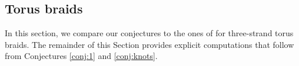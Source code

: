 \documentclass[12pt]{amsart}
\numberwithin{equation}{section}
\theoremstyle{definition}
\theoremstyle{remark}
\newcommand{\CE}{\mathcal{E}}
\newcommand{\CO}{\mathcal{O}}
\newcommand{\CT}{\mathcal{T}}
\renewcommand{\1}{\mathbf{1}}
\newcommand{\FH}{\mathrm{FHilb}}
\begin{document}

\subsection{Torus braids}
\label{sec:n=3 torus}

In this section, we compare our conjectures to the ones of \cite{GORS,ORS} for three-strand torus braids. The remainder of this Section provides explicit computations that follow from Conjectures \ref{conj:1} and \ref{conj:knots}.
\end{document}
